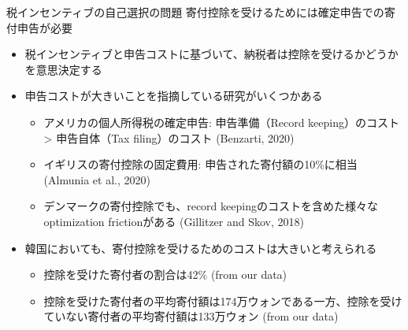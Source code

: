 \documentclass[
  ignorenonframetext,
  aspectratio=169,
]{beamer}
\providecommand{\tightlist}{%
  \setlength{\itemsep}{0pt}\setlength{\parskip}{0pt}}
\begin{document}
\begin{frame}{税インセンティブの自己選択の問題}
\protect\hypertarget{ux7a0eux30a4ux30f3ux30bbux30f3ux30c6ux30a3ux30d6ux306eux81eaux5df1ux9078ux629eux306eux554fux984c}{}
寄付控除を受けるためには確定申告での寄付申告が必要

\begin{itemize}
\tightlist
\item
  税インセンティブと申告コストに基づいて、納税者は控除を受けるかどうかを意思決定する
\item
  申告コストが大きいことを指摘している研究がいくつかある

  \begin{itemize}
  \tightlist
  \item
    アメリカの個人所得税の確定申告: 申告準備（Record keeping）のコスト \textgreater{} 申告自体（Tax filing）のコスト (Benzarti, 2020)
  \item
    イギリスの寄付控除の固定費用: 申告された寄付額の10\%に相当 (Almunia et al., 2020)
  \item
    デンマークの寄付控除でも、record keepingのコストを含めた様々なoptimization frictionがある (Gillitzer and Skov, 2018)
  \end{itemize}
\item
  韓国においても、寄付控除を受けるためのコストは大きいと考えられる

  \begin{itemize}
  \tightlist
  \item
    控除を受けた寄付者の割合は42\% (from our data)
  \item
    控除を受けた寄付者の平均寄付額は174万ウォンである一方、控除を受けていない寄付者の平均寄付額は133万ウォン (from our data)
  \end{itemize}
\end{itemize}
\end{frame}
\end{document}
